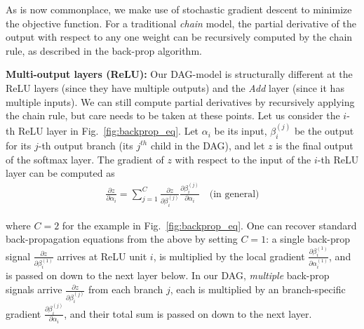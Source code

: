 \documentclass[10pt,twocolumn,letterpaper]{article}
\begin{document}
As is now commonplace, we make use of stochastic gradient descent to minimize the objective function. For a traditional \textit{chain} model, the partial derivative of the output with respect to any one weight can be recursively computed by the chain rule, as described in the back-prop algorithm.%

{\bf Multi-output layers (ReLU):} Our DAG-model is structurally different at the ReLU layers (since they have multiple outputs) and the \textit{Add} layer (since it has multiple inputs). We can still compute partial derivatives by recursively applying the chain rule, but care needs to be taken at these points. Let us consider the $i$-th ReLU layer in Fig.~\ref{fig:backprop_eq}. Let $\alpha_i$ be its input, $\beta_i^{(j)}$ be the output for its $j$-th output branch (its $j^{th}$ child in the DAG), and let $z$ is the final output of the softmax layer. The gradient of $z$ with respect to the input of the $i$-th ReLU layer can be computed as
\vspace{-5pt}
\begin{align}
\frac{\partial z}{\partial \alpha_i}=\sum_{j=1}^{C}\frac{\partial z}{\partial \beta_i^{(j)}}\frac{\partial \beta_i^{(j)}}{\partial \alpha_i} \quad \text {(in general)} \label{eq:backprop1}
\end{align}

\noindent where $C=2$ for the example in Fig.~\ref{fig:backprop_eq}. One can recover standard back-propagation equations from the above by setting $C=1$: a single back-prop signal $\frac{\partial z}{\partial \beta_i^{(1)}}$  arrives at ReLU unit $i$, is multiplied by the local gradient $\frac{\partial \beta_i^{(1)}}{\partial \alpha_i^{(1)}}$, and is passed on down to the next layer below. In our DAG, {\em multiple} back-prop signals arrive $\frac{\partial z}{\partial \beta_i^{(j)}}$ from each branch $j$, each is multiplied by an branch-specific gradient $\frac{\partial \beta_i^{(j)}}{\partial \alpha_i}$, and their total sum is passed on down to the next layer.

\end{document}
